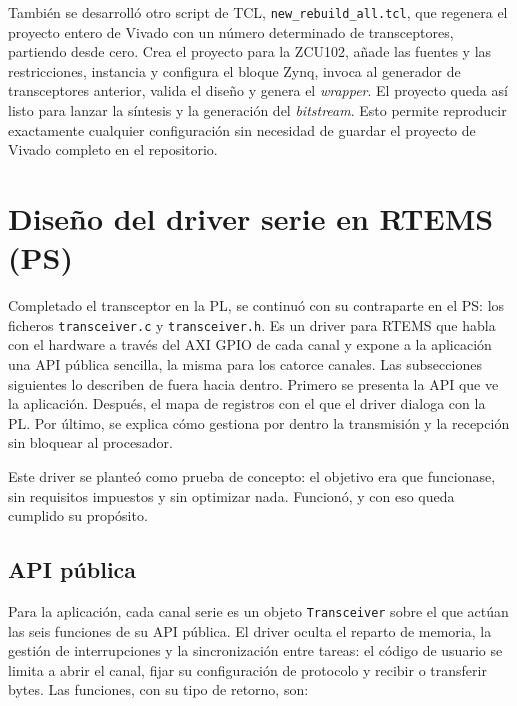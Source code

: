 También se desarrolló otro script de TCL, \texttt{new\_rebuild\_all.tcl}, que regenera el proyecto
entero de Vivado con un número determinado de transceptores, partiendo desde cero. Crea el
proyecto para la ZCU102, añade las fuentes y las restricciones, instancia y configura el bloque
Zynq, invoca al generador de transceptores anterior, valida el diseño y genera el \textit{wrapper}.
El proyecto queda así listo para lanzar la síntesis y la generación del \textit{bitstream}. Esto
permite reproducir exactamente cualquier configuración sin necesidad de guardar el proyecto
de Vivado completo en el repositorio.

\section{Diseño del driver serie en RTEMS (PS)} \label{sec:driver_rtems}

Completado el transceptor en la PL, se continuó con su contraparte en el PS: los ficheros
\texttt{transceiver.c} y \texttt{transceiver.h}. Es un driver para RTEMS que habla con el hardware a
través del AXI GPIO de cada canal y expone a la aplicación una API pública sencilla, la misma para
los catorce canales. Las subsecciones siguientes lo describen de fuera hacia dentro. Primero se
presenta la API que ve la aplicación. Después, el mapa de registros con el que el driver dialoga
con la PL. Por último, se explica cómo gestiona por dentro la transmisión y la recepción sin
bloquear al procesador.

Este driver se planteó como prueba de concepto: el objetivo era que funcionase, sin requisitos
impuestos y sin optimizar nada. Funcionó, y con eso queda cumplido su propósito.

\subsection{API pública}

Para la aplicación, cada canal serie es un objeto \texttt{Transceiver} sobre el que actúan las seis
funciones de su API pública. El driver oculta el reparto de memoria, la gestión de interrupciones y
la sincronización entre tareas: el código de usuario se limita a abrir el canal, fijar su
configuración de protocolo y recibir o transferir bytes. Las funciones, con su tipo de retorno, son:

